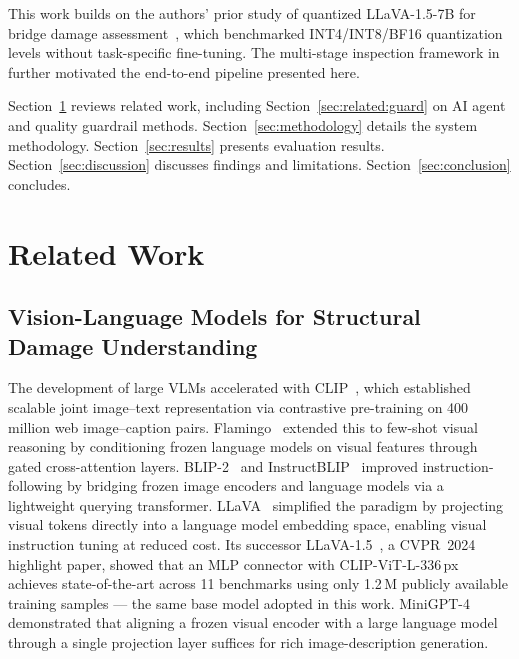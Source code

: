 \documentclass[twocolumn]{article}
\begin{document}
This work builds on the authors' prior study of quantized LLaVA-1.5-7B for
bridge damage assessment~\cite{yasuno2026quantized}, which benchmarked
INT4/INT8/BF16 quantization levels without task-specific fine-tuning.
The multi-stage inspection framework in~\cite{yasuno2026multistage} further
motivated the end-to-end pipeline presented here.

Section~\ref{sec:related} reviews related work, including
Section~\ref{sec:related:guard} on AI agent and quality guardrail methods.
Section~\ref{sec:methodology} details the system methodology.
Section~\ref{sec:results} presents evaluation results.
Section~\ref{sec:discussion} discusses findings and limitations.
Section~\ref{sec:conclusion} concludes.

\section{Related Work}
\label{sec:related}

\subsection{Vision-Language Models for Structural Damage Understanding}

The development of large VLMs accelerated with CLIP~\cite{radford2021clip},
which established scalable joint image--text representation via contrastive
pre-training on 400 million web image--caption pairs.
Flamingo~\cite{alayrac2022flamingo} extended this to few-shot visual reasoning
by conditioning frozen language models on visual features through gated
cross-attention layers.
BLIP-2~\cite{li2023blip2} and InstructBLIP~\cite{dai2023instructblip} improved
instruction-following by bridging frozen image encoders and language models
via a lightweight querying transformer.
LLaVA~\cite{liu2024llava} simplified the paradigm by projecting visual tokens
directly into a language model embedding space, enabling visual instruction
tuning at reduced cost.
Its successor LLaVA-1.5~\cite{liu2024llava15}, a CVPR~2024 highlight paper,
showed that an MLP connector with CLIP-ViT-L-336\,px achieves state-of-the-art
across 11 benchmarks using only 1.2\,M publicly available training samples
--- the same base model adopted in this work.
MiniGPT-4~\cite{zhu2024minigpt4} demonstrated that aligning a frozen visual
encoder with a large language model through a single projection layer suffices
for rich image-description generation.
\end{document}
